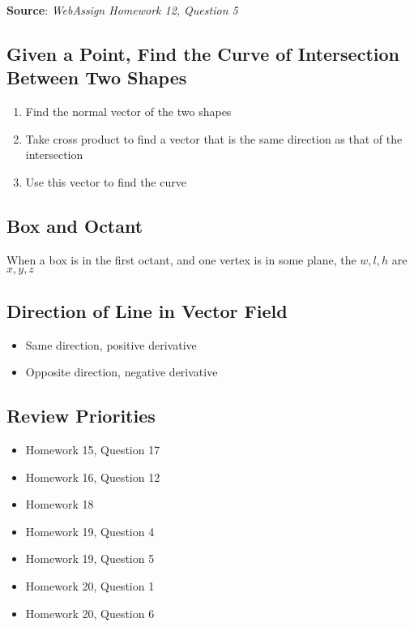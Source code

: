     \textbf{Source}: \textit{WebAssign Homework 12, Question 5}

  \subsection{Given a Point, Find the Curve of Intersection Between Two Shapes}

    \begin{enumerate}
      \item Find the normal vector of the two shapes
      \item Take cross product to find a vector that is the same direction
      as that of the intersection
      \item Use this vector to find the curve
    \end{enumerate}

  \subsection{Box and Octant}

    When a box is in the first octant, and one vertex is in
    some plane, the $ w, l, h $ are $ x, y, z $

  \subsection{Direction of Line in Vector Field}

    \begin{itemize}
      \item Same direction, positive derivative
      \item Opposite direction, negative derivative
    \end{itemize}

  \subsection{Review Priorities}

    \begin{itemize}
      \item Homework 15, Question 17
      \item Homework 16, Question 12
      \item Homework 18
      \item Homework 19, Question 4
      \item Homework 19, Question 5
      \item Homework 20, Question 1
      \item Homework 20, Question 6
    \end{itemize}